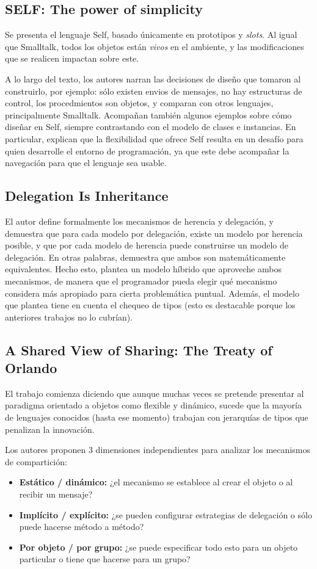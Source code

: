 \documentclass[a4paper,10pt]{article}
\newcommand{\strongitem}[1]{\item \textbf{#1:}}
\begin{document}
\subsection{SELF: The power of simplicity}
Se presenta el lenguaje Self, basado únicamente en prototipos y \textit{slots}. Al igual que Smalltalk, todos los objetos están \textit{vivos} en el ambiente, y las modificaciones que se realicen impactan sobre este.

A lo largo del texto, los autores narran las decisiones de diseño que tomaron al construirlo, por ejemplo: sólo existen envios de mensajes, no hay estructuras de control, los procedmientos son objetos, y comparan con otros lenguajes, principalmente Smalltalk. Acompañan también algunos ejemplos sobre cómo diseñar en Self, siempre contrastando con el modelo de clases e instancias. En particular, explican que la flexibilidad que ofrece Self resulta en un desafío para quien desarrolle el entorno de programación, ya que este debe acompañar la navegación para que el lenguaje sea usable. 

\subsection{Delegation Is Inheritance}

El autor define formalmente los mecanismos de herencia y delegación, y demuestra que para cada modelo por delegación, existe un modelo por herencia posible, y que por cada modelo de herencia puede construirse un modelo de delegación. En otras palabras, demuestra que ambos son matemáticamente equivalentes. Hecho esto, plantea un modelo híbrido que aproveche ambos mecanismos, de manera que el programador pueda elegir qué mecanismo considera más apropiado para cierta problemática puntual. Además, el modelo que plantea tiene en cuenta el chequeo de tipos (esto es destacable porque los anteriores trabajos no lo cubrían).


\subsection{A Shared View of Sharing: The Treaty of Orlando}
El trabajo comienza diciendo que aunque muchas veces se pretende presentar al paradigma orientado a objetos como flexible y dinámico, sucede que la mayoría de lenguajes conocidos (hasta ese momento) trabajan con jerarquías de tipos que penalizan la innovación.

Los autores proponen 3 dimensiones independientes para analizar los mecanismos de compartición:
\begin{itemize}
	\strongitem{Estático / dinámico} ¿el mecanismo se establece al crear el objeto o al recibir un mensaje?
	\strongitem{Implícito / explícito} ¿se pueden configurar estrategias de delegación o sólo puede hacerse método a método?
	\strongitem{Por objeto / por grupo} ¿se puede especificar todo esto para un objeto particular o tiene que hacerse para un grupo?
\end{itemize}
\end{document}

